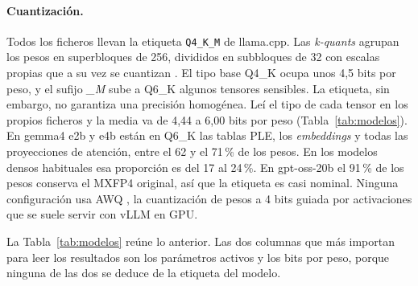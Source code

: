 \documentclass{article}
\begin{document}
\paragraph{Cuantización.} Todos los ficheros llevan la etiqueta
\texttt{Q4\_K\_M} de llama.cpp. Las \emph{k-quants} agrupan los pesos en
superbloques de 256, divididos en subbloques de 32 con escalas propias que a
su vez se cuantizan \citep{kquants}. El tipo base Q4\_K ocupa unos 4,5 bits
por peso, y el sufijo \emph{\_M} sube a Q6\_K algunos tensores sensibles. La
etiqueta, sin embargo, no garantiza una precisión homogénea. Leí el tipo de
cada tensor en los propios ficheros y la media va de 4,44 a 6,00 bits por
peso (Tabla~\ref{tab:modelos}). En gemma4 e2b y e4b están en Q6\_K las
tablas PLE, los \emph{embeddings} y todas las proyecciones de atención, entre
el 62 y el 71\,\% de los pesos. En los modelos densos habituales esa
proporción es del 17 al 24\,\%. En gpt-oss-20b el 91\,\% de los pesos
conserva el MXFP4 original, así que la etiqueta es casi nominal. Ninguna
configuración usa AWQ \citep{lin2024awq}, la cuantización de pesos a 4 bits
guiada por activaciones que se suele servir con vLLM en GPU.

La Tabla~\ref{tab:modelos} reúne lo anterior. Las dos columnas que más
importan para leer los resultados son los parámetros activos y los bits por
peso, porque ninguna de las dos se deduce de la etiqueta del modelo.
\end{document}
